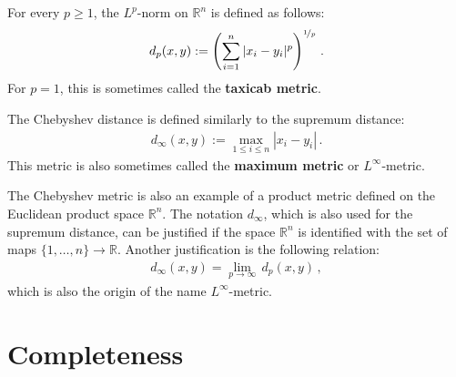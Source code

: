     \begin{example}[p-metric]\label{metric:p_metric}
        For every $p\geq1$, the $L^p$-norm on $\mathbb{R}^n$ is defined as follows:
        \begin{gather}
            d_p(x,y) := \left(\sum_{i=1}^n|x_i-y_i|^p\right)^{\nicefrac{1}{p}}\,.
        \end{gather}
        For $p=1$, this is sometimes called the \textbf{taxicab metric}.
    \end{example}
    \begin{example}\label{metric:chebyshev_distance}
        The Chebyshev distance is defined similarly to the supremum distance:
        \begin{gather}
            d_\infty(x,y) := \max_{1\leq i\leq n}|x_i-y_i|\,.
        \end{gather}
        This metric is also sometimes called the \textbf{maximum metric} or $L^\infty$-metric.
    \end{example}
    \begin{remark}
        The Chebyshev metric is also an example of a product metric defined on the Euclidean product space $\mathbb{R}^n$. The notation $d_\infty$, which is also used for the supremum distance, can be justified if the space $\mathbb{R}^n$ is identified with the set of maps $\{1,\ldots,n\}\rightarrow\mathbb{R}$. Another justification is the following relation:
        \begin{gather}
            d_\infty(x,y) = \lim_{p\rightarrow\infty}\,d_p(x,y)\,,
        \end{gather}
        which is also the origin of the name $L^\infty$-metric.
    \end{remark}

\section{Completeness}


